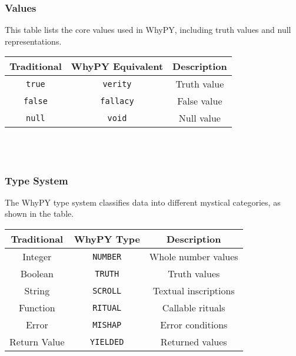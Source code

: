 \documentclass[11pt]{article}
\begin{document}
\subsubsection{Values}
This table lists the core values used in WhyPY, including truth values and null representations. \\ 
\par \vspace{1mm} 
\begin{tabular}{|c|c|c|}
\hline
\textbf{Traditional} & \textbf{WhyPY Equivalent} & \textbf{Description} \\
\hline
\texttt{true} & \texttt{verity} & Truth value \\
\texttt{false} & \texttt{fallacy} & False value \\
\texttt{null} & \texttt{void} & Null value \\
\hline
\end{tabular}
\\
\\

\subsubsection{Type System}
The WhyPY type system classifies data into different mystical categories, as shown in the table. \\
\par \vspace{1sp} 
\begin{tabular}{|c|c|c|}
\hline
\textbf{Traditional} & \textbf{WhyPY Type} & \textbf{Description} \\
\hline
Integer & \texttt{NUMBER} & Whole number values \\
Boolean & \texttt{TRUTH} & Truth values \\
String & \texttt{SCROLL} & Textual inscriptions \\
Function & \texttt{RITUAL} & Callable rituals \\
Error & \texttt{MISHAP} & Error conditions \\
Return Value & \texttt{YIELDED} & Returned values \\
\hline
\end{tabular}
\\ 
\\
\end{document}
